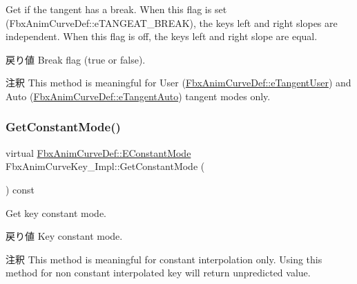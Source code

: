 Get if the tangent has a break. When this flag is set (Fbx\+Anim\+Curve\+Def\+::e\+T\+A\+N\+G\+E\+A\+T\+\_\+\+B\+R\+E\+AK), the key\textquotesingle{}s left and right slopes are independent. When this flag is off, the key\textquotesingle{}s left and right slope are equal. \begin{DoxyReturn}{戻り値}
Break flag ({\ttfamily true} or {\ttfamily false}). 
\end{DoxyReturn}
\begin{DoxyRemark}{注釈}
This method is meaningful for User (\hyperlink{class_fbx_anim_curve_def_ac810ccc5ca0527704ab5175479964b87a199cb16b2c861b12c334093ce796cb86}{Fbx\+Anim\+Curve\+Def\+::e\+Tangent\+User}) and Auto (\hyperlink{class_fbx_anim_curve_def_ac810ccc5ca0527704ab5175479964b87a56e3bad364851277281e94e81327dd25}{Fbx\+Anim\+Curve\+Def\+::e\+Tangent\+Auto}) tangent modes only. 
\end{DoxyRemark}
\mbox{\label{class_fbx_anim_curve_key___impl_a4bc0a9e316a26cda8eb93650cdd69cc6}} 
\subsubsection{\texorpdfstring{Get\+Constant\+Mode()}{GetConstantMode()}}
{\footnotesize\ttfamily virtual \hyperlink{class_fbx_anim_curve_def_a52885abd392ac8ac3da94bafc5fddd64}{Fbx\+Anim\+Curve\+Def\+::\+E\+Constant\+Mode} Fbx\+Anim\+Curve\+Key\+\_\+\+Impl\+::\+Get\+Constant\+Mode (\begin{DoxyParamCaption}{ }\end{DoxyParamCaption}) const\hspace{0.3cm}{\ttfamily [pure virtual]}}

Get key constant mode. \begin{DoxyReturn}{戻り値}
Key constant mode. 
\end{DoxyReturn}
\begin{DoxyRemark}{注釈}
This method is meaningful for constant interpolation only. Using this method for non constant interpolated key will return unpredicted value. 
\end{DoxyRemark}
\mbox{\label{class_fbx_anim_curve_key___impl_aac62e8ec0866fb13117b152b09bda0f6}} 
